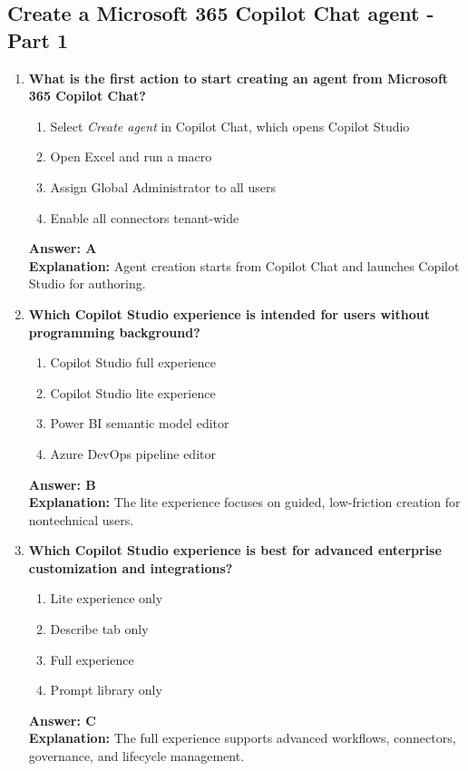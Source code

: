\documentclass[10pt]{article}
\begin{document}
\subsection{Create a Microsoft 365 Copilot Chat agent - Part 1}
\begin{enumerate}[leftmargin=*]

\item \textbf{What is the first action to start creating an agent from Microsoft 365 Copilot Chat?}
\begin{enumerate}[label=\Alph*.]
  \item Select \textit{Create agent} in Copilot Chat, which opens Copilot Studio
  \item Open Excel and run a macro
  \item Assign Global Administrator to all users
  \item Enable all connectors tenant-wide
\end{enumerate}
\textbf{Answer: A}\\
\textbf{Explanation:} Agent creation starts from Copilot Chat and launches Copilot Studio for authoring.

\item \textbf{Which Copilot Studio experience is intended for users without programming background?}
\begin{enumerate}[label=\Alph*.]
  \item Copilot Studio full experience
  \item Copilot Studio lite experience
  \item Power BI semantic model editor
  \item Azure DevOps pipeline editor
\end{enumerate}
\textbf{Answer: B}\\
\textbf{Explanation:} The lite experience focuses on guided, low-friction creation for nontechnical users.

\item \textbf{Which Copilot Studio experience is best for advanced enterprise customization and integrations?}
\begin{enumerate}[label=\Alph*.]
  \item Lite experience only
  \item Describe tab only
  \item Full experience
  \item Prompt library only
\end{enumerate}
\textbf{Answer: C}\\
\textbf{Explanation:} The full experience supports advanced workflows, connectors, governance, and lifecycle management.


\end{enumerate}
\end{document}
